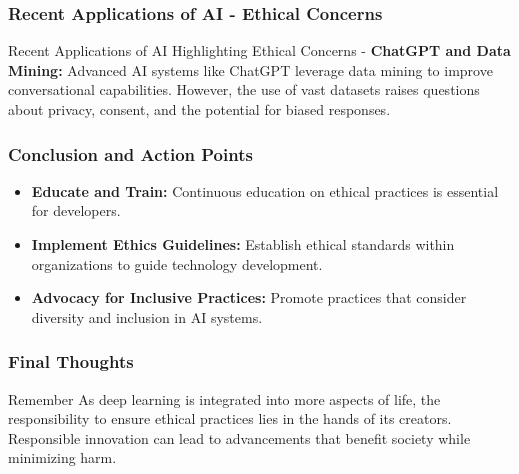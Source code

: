 \documentclass[aspectratio=169]{beamer}
\begin{document}
\begin{frame}[fragile]
    \frametitle{Recent Applications of AI - Ethical Concerns}
    \begin{block}{Recent Applications of AI Highlighting Ethical Concerns}
        - \textbf{ChatGPT and Data Mining:} 
        Advanced AI systems like ChatGPT leverage data mining to improve conversational capabilities. However, the use of vast datasets raises questions about privacy, consent, and the potential for biased responses.
    \end{block}
\end{frame}

\begin{frame}[fragile]
    \frametitle{Conclusion and Action Points}
    \begin{itemize}
        \item \textbf{Educate and Train:} Continuous education on ethical practices is essential for developers.
        \item \textbf{Implement Ethics Guidelines:} Establish ethical standards within organizations to guide technology development.
        \item \textbf{Advocacy for Inclusive Practices:} Promote practices that consider diversity and inclusion in AI systems.
    \end{itemize}
\end{frame}

\begin{frame}[fragile]
    \frametitle{Final Thoughts}
    \begin{block}{Remember}
        As deep learning is integrated into more aspects of life, the responsibility to ensure ethical practices lies in the hands of its creators. Responsible innovation can lead to advancements that benefit society while minimizing harm.
    \end{block}
\end{frame}
\end{document}
